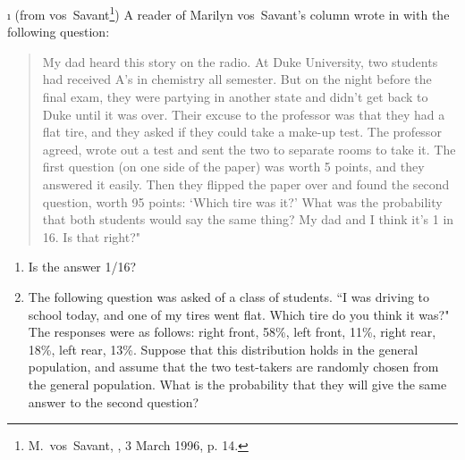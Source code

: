 \begin{LJSItem}
\i\label{exer 1.2.30}
(from vos~Savant\footnote{M.~vos~Savant, , 3 March 1996, p. 14.}) A reader of Marilyn vos~Savant's column wrote in with the following question: 
\begin{quote}
My dad heard this story on the radio. At Duke
University, two students had received A's in chemistry all semester. But on the night before
the final exam, they were partying in another state and didn't get back to Duke until it was
over. Their excuse to the professor was that they had a flat tire, and they asked if they
could take a make-up test. The professor agreed, wrote out a test and sent the two to separate
rooms to take it. The first question (on one side of the paper) was worth 5 points, and they
answered it easily. Then they flipped the paper over and found the second question, worth 95
points: `Which tire was it?' What was the probability that both students would say the
same thing? My dad and I think it's 1 in 16. Is that right?"
\end{quote}


\begin{enumerate}
\item
Is the answer 1/16?
\item
The following question was asked of a class of students.  ``I was driving to
school today, and one of my tires went flat.  Which tire do you think it was?"
The responses were as follows:  right front, 58\%, left front, 11\%, right rear, 
18\%, left rear, 13\%.  Suppose that this distribution holds in the general population,
and assume that the two test-takers are randomly chosen from the general population.  What
is the probability that they will give the same answer to the second question?
\end{enumerate}


\end{LJSItem}
